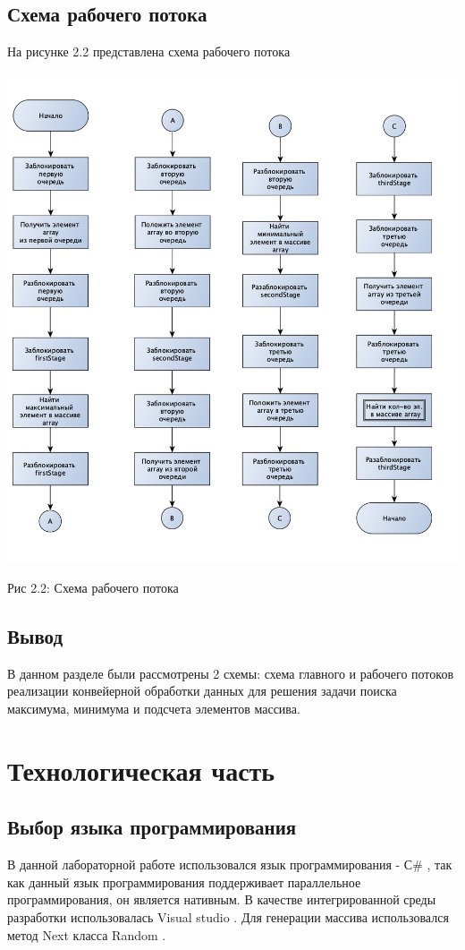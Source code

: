 \documentclass[12pt]{report}
\begin{document}
\newpage
\section{Схема рабочего потока}

На рисунке 2.2 представлена схема рабочего потока

\begin{center}
		\includegraphics[scale=0.5]{Thread.png}
		
			Рис 2.2: Схема рабочего потока
\end{center}

\section{Вывод}
В данном разделе были рассмотрены 2 схемы: схема главного и рабочего потоков реализации конвейерной обработки данных для решения задачи поиска максимума, минимума и подсчета элементов массива. 

\chapter{Технологическая часть}
\section{Выбор языка программирования}
В данной лабораторной работе использовался язык программирования - С\# \cite{C}, так как данный язык программирования поддерживает параллельное программирования, он является нативным. В качестве интегрированной среды разработки использовалась Visual studio  \cite{Vs}.  Для генерации массива использовался метод Next класса Random \cite{Rand}.
\end{document}
